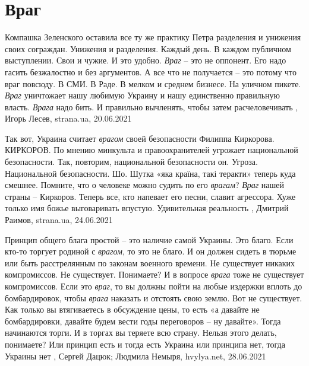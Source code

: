  
 
 
 
 
\chapter{Враг}
\label{sec:slova.vrag}

Компашка Зеленского оставила все ту же практику Петра разделения и унижения
своих сограждан. Унижения и разделения. Каждый день. В каждом публичном
выступлении. Свои и чужие.  И это удобно. \emph{Враг} – это не оппонент. Его надо
гасить безжалостно и без аргументов. А все что не получается – это потому что
враг повсюду. В СМИ. В Раде. В мелком и среднем бизнесе. На уличном пикете.
\emph{Враг} уничтожает нашу любимую Украину и нашу единственно правильную власть.
\emph{Врага} надо бить. И правильно вычленять, чтобы затем расчеловечивать
, 
Игорь Лесев, strana.ua, 20.06.2021

Так вот, Украина считает \emph{врагом} своей безопасности Филиппа Киркорова.
КИРКОРОВ.  По мнению минкульта и правоохранителей угрожает национальной
безопасности. Так, повторим, национальной безопасности он.  Угроза.
Национальной безопасности. Шо.  Шутка «яка країна, такі теракти» теперь куда
смешнее. Помните, что о человеке можно судить по его \emph{врагам}?  \emph{Враг} нашей страны
– Киркоров.  Теперь все, кто напевает его песни, славит агрессора.  Хуже только
имя божье выговаривать впустую.  Удивительная реальность
, Дмитрий Раимов, strana.ua, 24.06.2021

Принцип общего блага простой – это наличие самой Украины. Это благо. Если
кто-то торгует родиной с \emph{врагом}, то это не благо. И он должен сидеть в тюрьме
или быть расстрелянным по законам военного времени. Не существует никаких
компромиссов. Не существует. Понимаете? И в вопросе \emph{врага} тоже не существует
компромиссов. Если это \emph{враг}, то вы должны пойти на любые издержки вплоть до
бомбардировок, чтобы \emph{врага} наказать и отстоять свою землю. Вот не существует.
Как только вы втягиваетесь в обсуждение цены, то есть «а давайте не
бомбардировки, давайте будем вести годы переговоров – ну давайте». Тогда
начинаются торги. И в торгах вы теряете всю страну. Нельзя этого делать,
понимаете? Или принцип есть и тогда есть Украина или принципа нет, тогда
Украины нет
, 
Сергей Дацюк; Людмила Немыря, hvylya.net, 28.06.2021
